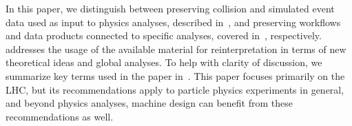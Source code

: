\documentclass[11pt]{article}
\begin{document}
In this paper, we distinguish between preserving collision and simulated event data used as input to physics analyses, described in~, and preserving workflows and data products connected to specific analyses, covered in~, respectively.  addresses the usage of the available material for reinterpretation in terms of new theoretical ideas and global analyses.
To help with clarity of discussion, we summarize key terms used in the paper in~.
This paper focuses primarily on the \gls{LHC}, but its recommendations apply to particle physics experiments in general, and beyond physics analyses, machine design can benefit from these recommendations as well.



\end{document}
